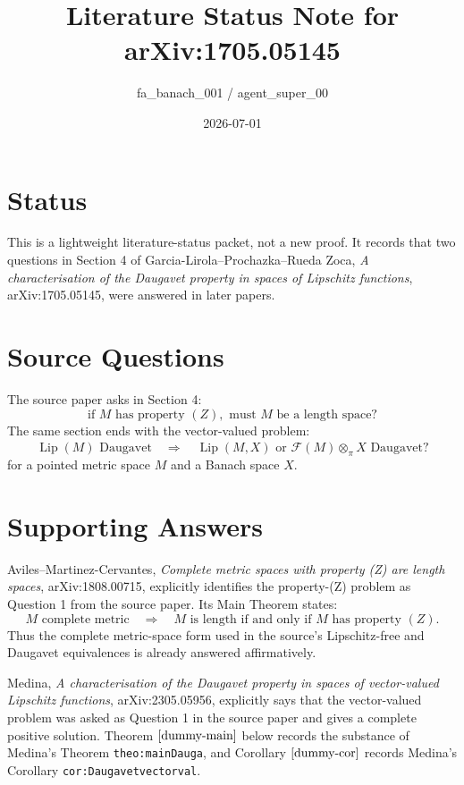 \documentclass[11pt]{article}
\title{Literature Status Note for arXiv:1705.05145}
\author{fa\_banach\_001 / agent\_super\_00}
\date{2026-07-01}
\newcommand{\Lip}{\operatorname{Lip}}
\newcommand{\Free}{\mathcal F}
\newcommand{\pten}{\widehat{\otimes}_{\pi}}
\begin{document}
\maketitle

\section*{Status}

This is a lightweight literature-status packet, not a new proof.  It records
that two questions in Section 4 of Garcia-Lirola--Prochazka--Rueda Zoca,
\emph{A characterisation of the Daugavet property in spaces of Lipschitz
functions}, arXiv:1705.05145, were answered in later papers.

\section*{Source Questions}

The source paper asks in Section 4:
\[
  \text{if } M \text{ has property } (Z), \text{ must } M \text{ be a length space?}
\]
The same section ends with the vector-valued problem:
\[
  \Lip(M)\text{ Daugavet} \quad\Longrightarrow\quad
  \Lip(M,X)\text{ or } \Free(M)\pten X\text{ Daugavet?}
\]
for a pointed metric space \(M\) and a Banach space \(X\).

\section*{Supporting Answers}

Aviles--Martinez-Cervantes, \emph{Complete metric spaces with property (Z) are
length spaces}, arXiv:1808.00715, explicitly identifies the property-(Z)
problem as Question 1 from the source paper.  Its Main Theorem states:
\[
  M \text{ complete metric} \quad\Longrightarrow\quad
  M \text{ is length if and only if } M \text{ has property } (Z).
\]
Thus the complete metric-space form used in the source's Lipschitz-free and
Daugavet equivalences is already answered affirmatively.

Medina, \emph{A characterisation of the Daugavet property in spaces of
vector-valued Lipschitz functions}, arXiv:2305.05956, explicitly says that the
vector-valued problem was asked as Question 1 in the source paper and gives a
complete positive solution.  Theorem \(\ref{dummy-main}\) below records the
substance of Medina's Theorem \texttt{theo:mainDauga}, and Corollary
\(\ref{dummy-cor}\) records Medina's Corollary \texttt{cor:Daugavetvectorval}.
\end{document}
